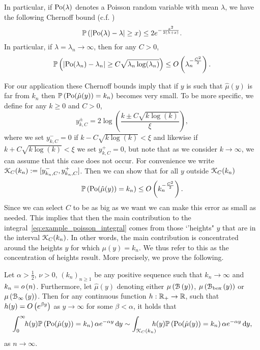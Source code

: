 In particular, if ${\mathrm{Po}}(\lambda)$ denotes a Poisson random variable with mean $\lambda$, we have the following Chernoff bound (c.f. \cite[Lemma 1.2]{penrose2003random})
\begin{equation}\label{eq:def_chernoff_bound_poisson}
	\mathbb{P}\left(\left|\mathrm{Po}(\lambda) - \lambda\right| \ge x\right) \le 2e^{-\frac{x^2}{2(\lambda + x)}}.
\end{equation}
In particular, if $\lambda = \lambda_n \to \infty$, then for any $C>0$,
\begin{equation}\label{eq:def_chernoff_bound_poisson_C}
	\mathbb{P}\left(\left|\mathrm{Po}(\lambda_n) - \lambda_n\right| \ge C \sqrt{\lambda_n\log(\lambda_n)}\right) \le O\left(\lambda_n^{-\frac{C^2}{2}}\right).
\end{equation}

For our application these Chernoff bounds imply that if $y$ is such that $\hat{\mu}(y)$ is far from $k_n$ then $\mathbb{P}\left({\mathrm{Po}}(\hat{\mu}(y)) = k_n\right)$ becomes very small. To be more specific, we define for any $k \ge 0$ and $C > 0$,
\begin{equation}\label{eq:def_y_k_C}
	y_{k,C}^\pm = 2 \log\left(\frac{k \pm C \sqrt{k \log(k)}}{\xi}\right),
\end{equation}
where we set $y_{k,C}^- = 0$ if $k - C \sqrt{k \log(k)} < \xi$ and likewise if $k + C \sqrt{k \log(k)} < \xi$ we set $y_{k,C}^+=0$, but  note that as we consider $k\rightarrow\infty$, we can assume that this case does not occur. For convenience we write ${\mathcal K}_C(k_n) := [y_{k_n,C}^-, y_{k_n,C}^+]$. Then we can show that for all $y$ outside ${\mathcal K}_C(k_n)$
\begin{equation}\label{eq:chernoff_bound_degrees}
	\mathbb{P}\left({\mathrm{Po}}(\hat{\mu}(y)) = k_n\right) \le O\left(k_n^{-\frac{C^2}{2}}\right).
\end{equation}
Since we can select $C$ to be as big as we want we can make this error as small as needed. This implies that then the main contribution to the integral~\eqref{eq:example_poisson_integral} comes from those `'heights" $y$ that are in the interval ${\mathcal K}_C(k_n)$. In other words, the main contribution is concentrated around the heights $y$ for which $\mu(y) = k_n$. We thus refer to this as the concentration of heights result. More precisely, we prove the following.

\begin{proposition}\label{prop:concentration_height_general}
Let $\alpha > \frac{1}{2}$, $\nu > 0$, $(k_n)_{n \ge 1}$ be any positive sequence such that $k_n \to \infty$ and $k_n = o\left(n\right)$. Furthermore, let $\hat{\mu}(y)$ denoting either $\mu\left({\mathcal B}\left(y\right)\right)$, $\mu\left({\mathcal B}_{\text{box}}\left(y\right)\right)$ or $\mu\left({\mathcal B}_{\infty}\left(y\right)\right)$. Then for any continuous function $h : {\mathbb R}_+ \rightarrow  {\ensuremath{\mathbb R}}$, such that $h(y) = O\left(e^{\beta y}\right)$ as $y \to \infty$ for some $\beta < \alpha$, it holds that
\begin{equation}\label{eq:error_bound_int_rho_not_K}
	\int_0^\infty \hspace{-3pt} h(y) \mathbb{P}\left({\mathrm{Po}}(\hat{\mu}(y)) = k_n\right) \alpha e^{-\alpha y} \operatorname{\mathrm{d}\hspace{-2pt}} y
	\sim \int_{{\mathcal K}_C(k_n)} \hspace{-8pt} h(y) \mathbb{P}\left({\mathrm{Po}}(\hat{\mu}(y)) = k_n\right) \alpha e^{-\alpha y} \operatorname{\mathrm{d}\hspace{-2pt}} y,
\end{equation}
as $n \to \infty$.
\end{proposition}


